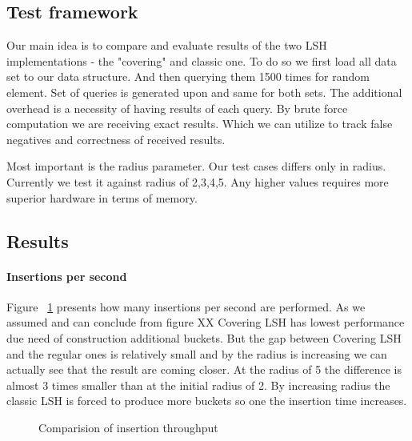 \subsection{Test framework}

Our main idea is to compare and evaluate results of the two LSH implementations - the "covering" and classic one. To do so we first load all data set to our data structure. And then querying them 1500 times for random element. Set of queries is generated upon and same for both sets. The additional overhead is a necessity of having results of each query. By brute force computation we are receiving exact results. Which we can utilize to track false negatives and correctness of received results.

Most important is the radius parameter. Our test cases differs only in radius. Currently we test it against radius of 2,3,4,5. Any higher values requires more superior hardware in terms of memory.

\subsection{Results}

\paragraph{Insertions per second}

Figure ~\ref{fig:insertions-per-second} presents how many insertions per second are performed. As we assumed and can conclude from figure XX  Covering LSH has lowest performance due need of construction additional buckets. But the gap between Covering LSH and the regular ones is relatively small and by the radius is increasing we can actually see that the result are coming closer. At the radius of 5 the difference is almost 3 times smaller than at the initial radius of 2. By increasing radius the classic LSH is forced to produce more buckets so one the insertion time increases.

\begin{figure}[ht]

  \caption{Comparision of insertion throughput}
  \label{fig:insertions-per-second}
\end{figure}

